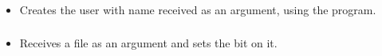 \subsubsection*{}\label{subsec:CreateUser}

\begin{itemize}[label={}]
    \item Creates the user with name received as an argument, using the  program.
\end{itemize}

\subsubsection*{}\label{subsec:Setuid}

\begin{itemize}[label={}]
    \item Receives a file as an argument and sets the  bit on it.
\end{itemize}

